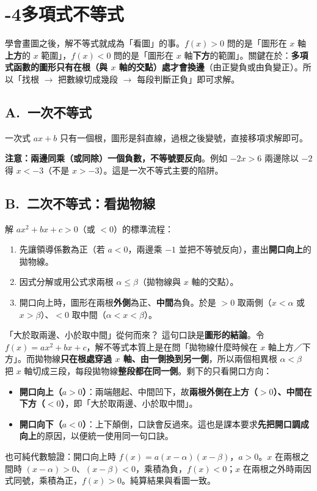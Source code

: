 \documentclass[11pt]{article}
\begin{document}
\section*{-4\quad 多項式不等式}

學會畫圖之後，解不等式就成為「看圖」的事。$f(x)>0$ 問的是「圖形在 $x$ 軸\textbf{上方}的 $x$ 範圍」，$f(x)<0$ 問的是「圖形在 $x$ 軸\textbf{下方}的範圍」。關鍵在於：\textbf{多項式函數的圖形只有在根（與 $x$ 軸的交點）處才會換邊}（由正變負或由負變正）。所以「找根 $\rightarrow$ 把數線切成幾段 $\rightarrow$ 每段判斷正負」即可求解。

\subsection*{\sffamily A.\ 一次不等式}

一次式 $ax+b$ 只有一個根，圖形是斜直線，過根之後變號，直接移項求解即可。

\textbf{注意：}\textbf{兩邊同乘（或同除）一個負數，不等號要反向}。例如 $-2x>6$ 兩邊除以 $-2$ 得 $x<-3$（不是 $x>-3$）。這是一次不等式主要的陷阱。

\subsection*{\sffamily B.\ 二次不等式：看拋物線}

解 $ax^2+bx+c>0$（或 $<0$）的標準流程：
\begin{enumerate}\setlength{\itemsep}{1pt}
\item 先讓領導係數為正（若 $a<0$，兩邊乘 $-1$ 並把不等號反向），畫出\textbf{開口向上}的拋物線。
\item 因式分解或用公式求兩根 $\alpha\le\beta$（拋物線與 $x$ 軸的交點）。
\item 開口向上時，圖形在兩根\textbf{外側}為正、\textbf{中間}為負。於是 $>0$ 取兩側（$x<\alpha$ 或 $x>\beta$）、$<0$ 取中間（$\alpha<x<\beta$）。
\end{enumerate}

\begin{補充框}{「大於取兩邊、小於取中間」從何而來？}
這句口訣是\textbf{圖形的結論}。令 $f(x)=ax^2+bx+c$，解不等式本質上是在問「拋物線什麼時候在 $x$ 軸上方／下方」。而拋物線\textbf{只在根處穿過 $x$ 軸、由一側換到另一側}，所以兩個相異根 $\alpha<\beta$ 把 $x$ 軸切成三段，每段拋物線\textbf{整段都在同一側}。剩下的只看開口方向：
\begin{itemize}\setlength{\itemsep}{1pt}
\item \textbf{開口向上（$a>0$）}：兩端翹起、中間凹下，故\textbf{兩根外側在上方（$>0$）、中間在下方（$<0$）}，即「大於取兩邊、小於取中間」。
\item \textbf{開口向下（$a<0$）}：上下顛倒，口訣會反過來。這也是課本要求\textbf{先把開口調成向上}的原因，以便統一使用同一句口訣。
\end{itemize}
也可純代數驗證：開口向上時 $f(x)=a(x-\alpha)(x-\beta)$，$a>0$。$x$ 在兩根之間時 $(x-\alpha)>0$、$(x-\beta)<0$，乘積為負，$f(x)<0$；$x$ 在兩根之外時兩因式同號，乘積為正，$f(x)>0$。純算結果與看圖一致。
\end{補充框}
\end{document}

